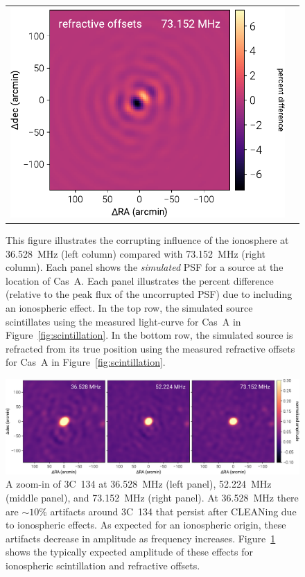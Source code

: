 \documentclass[twocolumn]{aastex61}
\begin{document}
\begin{figure}[t]
\begin{tabular}{cc}
        \includegraphics[width=\columnwidth]{figures/ionospheric-simulations/refraction-18} \\
    \end{tabular}
    \caption{
        This figure illustrates the corrupting influence of the ionosphere at 36.528~MHz (left
        column) compared with 73.152~MHz (right column). Each panel shows the \textit{simulated} PSF
        for a source at the location of Cas~A.  Each panel illustrates the percent difference
        (relative to the peak flux of the uncorrupted PSF) due to including an ionospheric effect.
        In the top row, the simulated source scintillates using the measured light-curve for Cas~A
        in Figure~\ref{fig:scintillation}. In the bottom row, the simulated source is refracted from
        its true position using the measured refractive offsets for Cas~A in
        Figure~\ref{fig:scintillation}.
    }
    \label{fig:ionospheric-simulations}
\end{figure}

\begin{figure}[t]
    \centering
    \includegraphics[width=\textwidth]{figures/postage-stamps/3C134}
    \caption{
        A zoom-in of 3C~134 at 36.528~MHz (left panel), 52.224~MHz (middle panel), and 73.152~MHz
        (right panel). At 36.528~MHz there are $\sim10\%$ artifacts around 3C~134 that persist after
        CLEANing due to ionospheric effects. As expected for an ionospheric origin, these artifacts
        decrease in amplitude as frequency increases. Figure~\ref{fig:ionospheric-simulations} shows
        the typically expected amplitude of these effects for ionospheric scintillation and
        refractive offsets.
    }
    \label{fig:3C134}
\end{figure}
\end{document}
